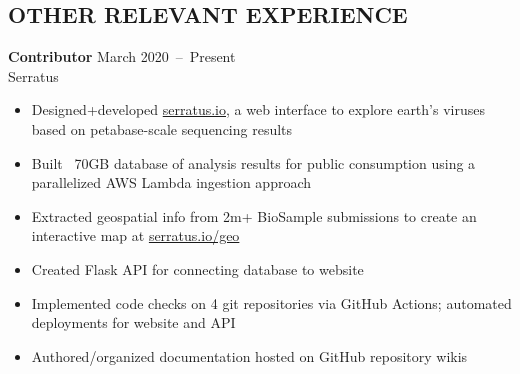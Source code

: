 \documentclass[line,resmargin]{res}
\begin{document}
\begin{resume}
\section{OTHER RELEVANT EXPERIENCE}

    \textbf{Contributor}    \hfill March 2020~--~Present \\
    Serratus
    \begin{itemize}  \itemsep -2pt
        \item Designed+developed \href{https://serratus.io/}{serratus.io}, a web interface to explore earth's viruses based on petabase-scale sequencing results
        \item Built ~70GB database of analysis results for public consumption using a parallelized AWS Lambda ingestion approach
        \item Extracted geospatial info from 2m+ BioSample submissions to create an interactive map at \href{https://serratus.io/geo}{serratus.io/geo}
        \item Created Flask API for connecting database to website
        \item Implemented code checks on 4 git repositories via GitHub Actions; automated deployments for website and API
        \item Authored/organized documentation hosted on GitHub repository wikis
    \end{itemize}



\end{resume}
\end{document}
